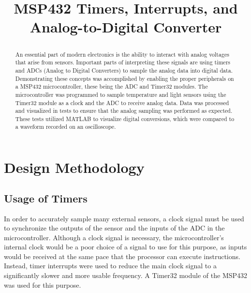 \documentclass[conference]{IEEEtran}
\begin{document}
\title{MSP432 Timers, Interrupts, and Analog-to-Digital Converter\\

\author{
\and
{}
}
}

\maketitle

\begin{abstract}
An essential part of modern electronics is the ability to interact with
analog voltages that arise from sensors. Important parts of interpreting
these signals are using timers and ADCs (Analog to Digital Converters) to
sample the analog data into digital data. Demonstrating these concepts was
accomplished by enabling the proper peripherals on a MSP432 microcontroller,
these being the ADC and Timer32 modules. The microcontroller was programmed
to sample temperature and light sensors using the Timer32 module
as a clock and the ADC to receive analog data. Data was processed and
visualized in tests to ensure that the analog sampling was performed as
expected. These tests utilized MATLAB to visualize digital conversions,
which were compared to a waveform recorded on an oscilloscope.
\end{abstract}

\section{Design Methodology}

\subsection{Usage of Timers}
In order to accurately sample many external sensors, a clock signal must be 
used to synchronize the outputs of the sensor and the inputs of the ADC in
the microcontroller. Although a clock signal is necessary, the
microcontroller's internal clock would be a poor choice of a signal to use
for this purpose, as inputs would be received at the same pace that the
processor can execute instructions. Instead, timer interrupts were used to
reduce the main clock signal to a significantly slower and more usable
frequency. A Timer32 module of the MSP432 was used for this purpose.
\end{document}
